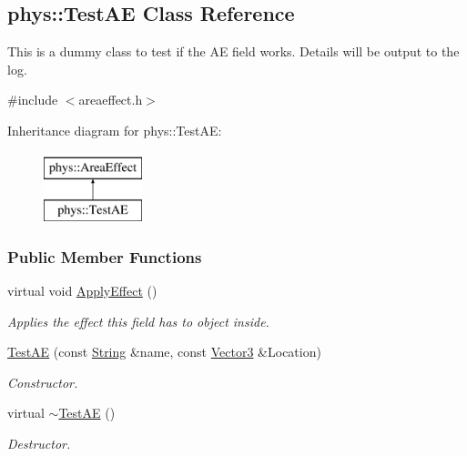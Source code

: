\hypertarget{classphys_1_1TestAE}{
\subsection{phys::TestAE Class Reference}
\label{classphys_1_1TestAE}
}


This is a dummy class to test if the AE field works. Details will be output to the log.  




{\ttfamily \#include $<$areaeffect.h$>$}

Inheritance diagram for phys::TestAE:\begin{figure}[H]
\begin{center}
\leavevmode
\includegraphics[height=2.000000cm]{classphys_1_1TestAE}
\end{center}
\end{figure}
\subsubsection*{Public Member Functions}
\begin{DoxyCompactItemize}
\item 
virtual void \hyperlink{classphys_1_1TestAE_a191c60dbfa277e850ea392d9ab774c42}{ApplyEffect} ()
\begin{DoxyCompactList}\small\item\em Applies the effect this field has to object inside. \item\end{DoxyCompactList}\item 
\hyperlink{classphys_1_1TestAE_ac3c760a899bbc3b55beb648245e49a21}{TestAE} (const \hyperlink{namespacephys_aa03900411993de7fbfec4789bc1d392e}{String} \&name, const \hyperlink{classphys_1_1Vector3}{Vector3} \&Location)
\begin{DoxyCompactList}\small\item\em Constructor. \item\end{DoxyCompactList}\item 
virtual \hyperlink{classphys_1_1TestAE_aa3ceb77df713b5cafa97495de61e4b0a}{$\sim$TestAE} ()
\begin{DoxyCompactList}\small\item\em Destructor. \item\end{DoxyCompactList}\end{DoxyCompactItemize}


